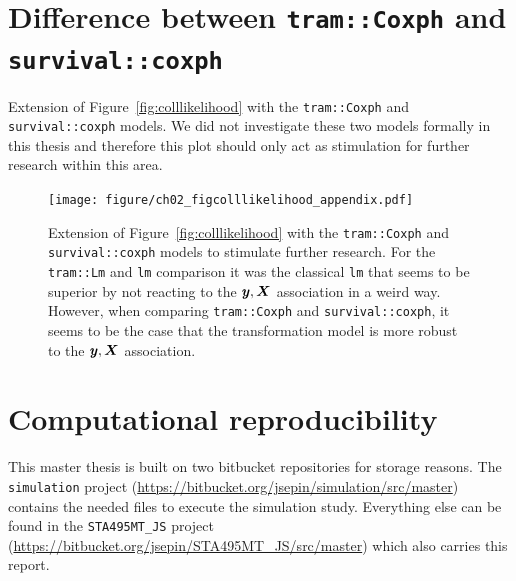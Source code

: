 \documentclass[11pt,a4paper,twoside]{book}\usepackage[]{graphicx}\usepackage[]{xcolor}
\begin{document}
\newpage
\section{Difference between \texttt{tram::Coxph} and \texttt{survival::coxph}}\label{sec:mo}

Extension of Figure~\ref{fig:colllikelihood} with the \texttt{tram::Coxph} and \texttt{survival::coxph} models.
We did not investigate these two models formally in this thesis and therefore this plot should only act as stimulation for further research within this area.

\begin{figure}[H]%
\centering
\texttt{[image: figure/ch02\_figcolllikelihood\_appendix.pdf]}
\caption{Extension of Figure~\ref{fig:colllikelihood} with the \texttt{tram::Coxph} and \texttt{survival::coxph} models to stimulate further research. For the \texttt{tram::Lm} and \texttt{lm} comparison it was the classical \texttt{lm} that seems to be superior by not reacting to the ${\textbf{\textit{y}}},{\boldsymbol{X}}$ association in a weird way. However, when comparing \texttt{tram::Coxph} and \texttt{survival::coxph}, it seems to be the case that the transformation model is more robust to the ${\textbf{\textit{y}}},{\boldsymbol{X}}$ association.
}
\label{fig:collappendix}
\end{figure}



\newpage
\section{Computational reproducibility}\label{sec:repro}
This master thesis is built on two bitbucket repositories for storage reasons. The \texttt{simulation} project (\url{https://bitbucket.org/jsepin/simulation/src/master}) contains the needed files to execute the simulation study. Everything else can be found in the \texttt{STA495MT\_JS} project (\url{https://bitbucket.org/jsepin/STA495MT_JS/src/master}) which also carries this report.
\end{document}
